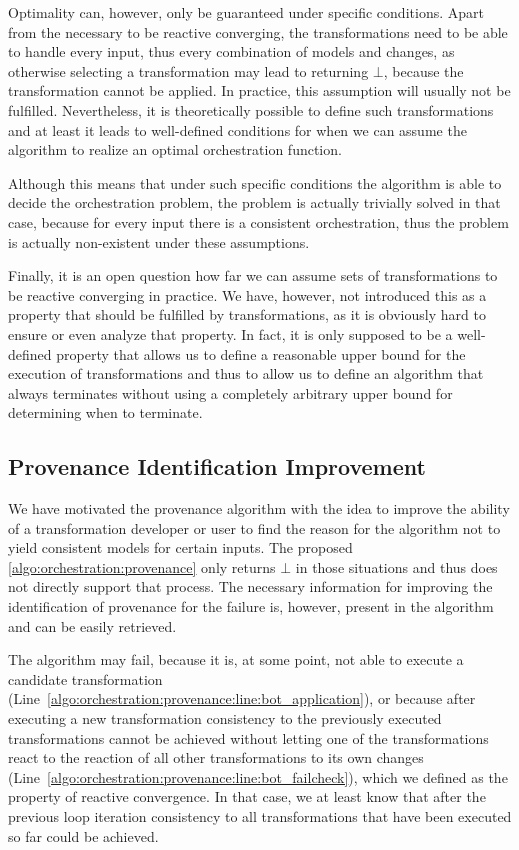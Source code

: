 Optimality can, however, only be guaranteed under specific conditions.
Apart from the necessary to be reactive converging, the transformations need to be able to handle every input, thus every combination of models and changes, as otherwise selecting a transformation may lead to  returning $\bot$, because the transformation cannot be applied.
In practice, this assumption will usually not be fulfilled.
Nevertheless, it is theoretically possible to define such transformations and at least it leads to well-defined conditions for when we can assume the algorithm to realize an optimal orchestration function.

Although this means that under such specific conditions the algorithm is able to decide the orchestration problem, the problem is actually trivially solved in that case, because for every input there is a consistent orchestration, thus the problem is actually non-existent under these assumptions.

Finally, it is an open question how far we can assume sets of transformations to be reactive converging in practice.
We have, however, not introduced this as a property that should be fulfilled by transformations, as it is obviously hard to ensure or even analyze that property.
In fact, it is only supposed to be a well-defined property that allows us to define a reasonable upper bound for the execution of transformations and thus to allow us to define an algorithm that always terminates without using a completely arbitrary upper bound for determining when to terminate.


\subsection{Provenance Identification Improvement}

We have motivated the provenance algorithm with the idea to improve the ability of a transformation developer or user to find the reason for the algorithm not to yield consistent models for certain inputs.
The proposed \autoref{algo:orchestration:provenance} only returns $\bot$ in those situations and thus does not directly support that process.
The necessary information for improving the identification of provenance for the failure is, however, present in the algorithm and can be easily retrieved.

The algorithm may fail, because it is, at some point, not able to execute a candidate transformation (Line~\ref{algo:orchestration:provenance:line:bot_application}), or because after executing a new transformation consistency to the previously executed transformations cannot be achieved without letting one of the transformations react to the reaction of all other transformations to its own changes (Line~\ref{algo:orchestration:provenance:line:bot_failcheck}), which we defined as the property of reactive convergence.
In that case, we at least know that after the previous loop iteration consistency to all transformations that have been executed so far could be achieved.

